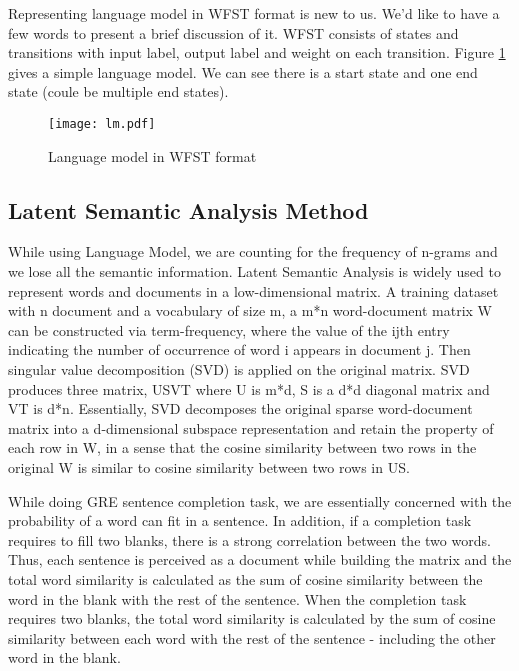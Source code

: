 \documentclass[11pt]{article}
\begin{document}
Representing language model in WFST\cite{Mohri:08} format is new to us. We'd like to have a few words to present a brief discussion of it. WFST consists of states and transitions with input label, output label and weight on each transition. Figure \ref{fig:lm} gives a simple language model. We can see there is a start state and one end state (coule be multiple end states).

\begin{figure}[t]
\centering
\texttt{[image: lm.pdf]}
\caption{Language model in WFST format}
\label{fig:lm}
\end{figure}

\subsection{Latent Semantic Analysis Method}
While using Language Model, we are counting for the frequency of n-grams and we lose all the semantic information. Latent Semantic Analysis is widely used to represent words and documents in a low-dimensional matrix. A training dataset with n document and a vocabulary of size m, a m*n word-document matrix W can be constructed via term-frequency, where the value of the ijth entry indicating the number of occurrence of word i appears in document j. Then singular value decomposition (SVD) is applied on the original matrix. SVD produces three matrix, USVT where U is m*d, S is a d*d diagonal matrix and VT is d*n. Essentially, SVD decomposes the original sparse word-document matrix into a d-dimensional subspace representation and retain the property of each row in W, in a sense that the cosine similarity between two rows in the original W is similar to cosine similarity between two rows in US. 

While doing GRE sentence completion task, we are essentially concerned with the probability of a word can fit in a sentence. In addition, if a completion task requires to fill two blanks, there is a strong correlation between the two words. Thus, each sentence is perceived as a document while building the matrix and the total word similarity is calculated as the sum of cosine similarity between the word in the blank with the rest of the sentence. When the completion task requires two blanks, the total word similarity is calculated by the sum of cosine similarity between each word with the rest of the sentence - including the other word in the blank.
\end{document}
